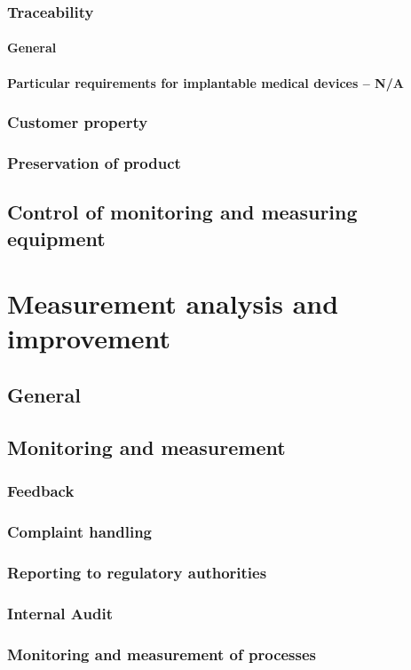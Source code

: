 \documentclass{article}
\begin{document}
\subsubsection{Traceability}
\paragraph{General}
\paragraph{Particular requirements for implantable medical devices – N/A}
\subsubsection{Customer property}
\subsubsection{Preservation of product}
\subsection{Control of monitoring and measuring equipment}
\section{Measurement analysis and improvement}
\subsection{General}
\subsection{Monitoring and measurement}
\subsubsection{Feedback}
\subsubsection{Complaint handling}
\subsubsection{Reporting to regulatory authorities}
\subsubsection{Internal Audit}
\subsubsection{Monitoring and measurement of processes}
\end{document}
